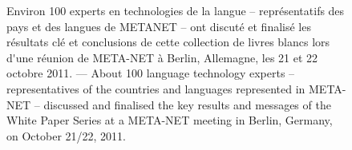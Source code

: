 \renewcommand*{\figureformat}{}
\renewcommand*{\captionformat}{}

\begin{figure}[htbp]
  \center
  \caption{Environ 100 experts en technologies de la langue -- représentatifs des pays et des langues de METANET -- ont discuté et finalisé les résultats clé et conclusions de cette collection de livres blancs lors d{\mbox '}une réunion de META-NET à Berlin, Allemagne, les 21 et 22 octobre 2011. --- \textcolor{grey1}{About 100 language technology experts -- representatives of the countries and languages represented in META-NET -- discussed and finalised the key results and messages of the White Paper Series at a META-NET meeting in Berlin, Germany, on October 21/22, 2011.}}
\end{figure}

\cleardoublepage

\label{whitepaperseries}

